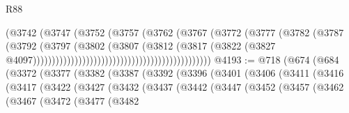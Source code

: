 \begin{lexlean}{R88}
\begin{coremodule}
                                                              (@3742
                                                                (@3747
                                                                  (@3752
                                                                    (@3757
                                                                      (@3762
                                                                        (@3767
                                                                          (@3772
                                                                            (@3777
                                                                              (@3782
                                                                                (@3787
                                                                                  (@3792
                                                                                    (@3797
                                                                                      (@3802
                                                                                        (@3807
                                                                                          (@3812
                                                                                            (@3817
                                                                                              (@3822
                                                                                                (@3827
                                                                                                  @4097)))))))))))))))))))))))))))))))))))))))))))))))
@4193 := @718
    (@674
      (@684
        (@3372
          (@3377
            (@3382
              (@3387
                (@3392
                  (@3396
                    (@3401
                      (@3406
                        (@3411
                          (@3416
                            (@3417
                              (@3422
                                (@3427
                                  (@3432
                                    (@3437
                                      (@3442
                                        (@3447
                                          (@3452
                                            (@3457
                                              (@3462
                                                (@3467
                                                  (@3472
                                                    (@3477
                                                      (@3482

\end{coremodule}
\end{lexlean}
